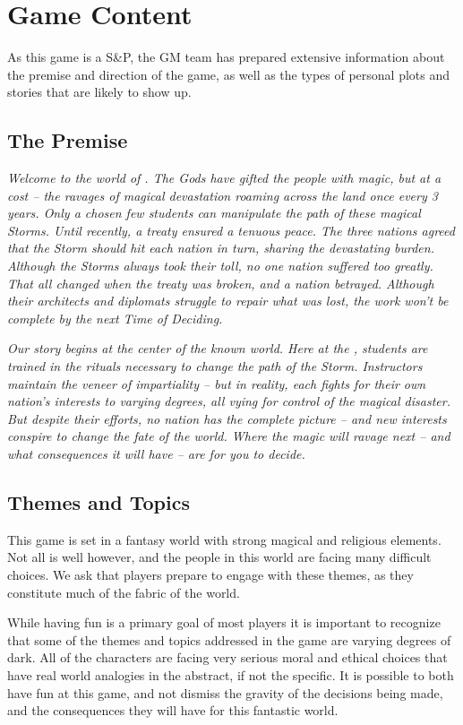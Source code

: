 \documentclass[sheet]{GL2020}
\begin{document}
\section{Game Content}
As this game is a S\&P, the GM team has prepared extensive information about the premise and direction of the game, as well as the types of personal plots and stories that are likely to show up.

\subsection{The Premise}
\emph{Welcome to the world of \pEarth{}. The Gods have gifted the people with magic, but at a cost -- the ravages of magical devastation roaming across the land once every 3 years. Only a chosen few students can manipulate the path of these magical Storms. Until recently, a treaty ensured a tenuous peace. The three nations agreed that the Storm should hit each nation in turn, sharing the devastating burden. Although the Storms always took their toll, no one nation suffered too greatly. That all changed when the treaty was broken, and a nation betrayed. Although their architects and diplomats struggle to repair what was lost, the work won’t be complete by the next Time of Deciding.}

\emph{Our story begins at the center of the known world. Here at the \pSchool{}, students are trained in the rituals necessary to change the path of the Storm. Instructors maintain the veneer of impartiality -- but in reality, each fights for their own nation’s interests to varying degrees, all vying for control of the magical disaster. But despite their efforts, no nation has the complete picture -- and new interests conspire to change the fate of the world. Where the magic will ravage next -- and what consequences it will have -- are for you to decide.}

\subsection{Themes and Topics}
This game is set in a fantasy world with strong magical and religious elements. Not all is well however, and the people in this world are facing many difficult choices. We ask that players prepare to engage with these themes, as they constitute much of the fabric of the world.

While having fun is a primary goal of most players it is important to recognize that some of the themes and topics addressed in the game are varying degrees of dark. All of the characters are facing very serious moral and ethical choices that have real world analogies in the abstract, if not the specific. It is possible to both have fun at this game, and not dismiss the gravity of the decisions being made, and the consequences they will have for this fantastic world.
\end{document}
